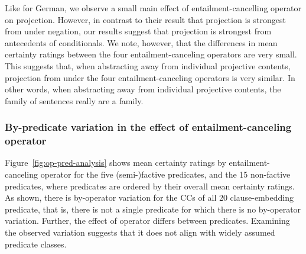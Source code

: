 \documentclass[a4paper,12pt,twoside]{article}
\newcommand{\mcdm}[1]{\textbf{\color{blue}[mcdm: #1]}}
\begin{document}
		Like \citet{sieker_projective_2022} for German, we observe a small main effect of entailment-cancelling operator on projection. However, in contrast to their result that projection is strongest from under negation, our results suggest that projection is strongest from antecedents of conditionals.
        We note, however, that the differences in mean certainty ratings between the four entailment-canceling operators are very small. This suggests that, when abstracting away from individual projective contents, projection from under the four entailment-canceling operators is very similar. In other words, when abstracting away from individual projective contents, the family of sentences really are a family.


	\subsubsection{By-predicate variation in the effect of entailment-canceling operator}\label{s:by-pred}

        Figure~\ref{fig:op-pred-analysis} shows mean certainty ratings by entailment-canceling operator for the five (semi-)factive predicates, and the 15 non-factive predicates, where predicates are ordered by their overall mean certainty ratings.
        As shown, there is by-operator variation for the CCs of all 20 clause-embedding predicate, that is, there is not a single predicate for which there is no by-operator variation. Further, the effect of operator differs between predicates. Examining the observed variation suggests that it does not align with widely assumed predicate classes.
\end{document}
